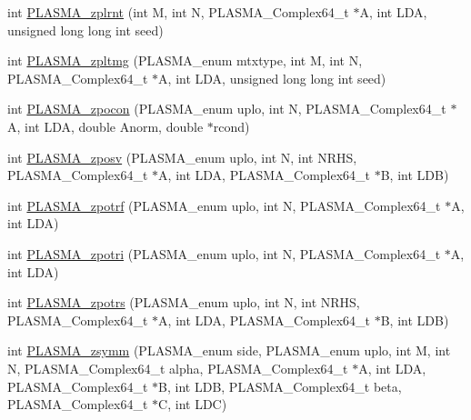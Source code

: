 \begin{DoxyCompactItemize}
\item 
int \hyperlink{group__PLASMA__Complex64__t_gaed78cffc7c2835c485ef7c8e3761d127_gaed78cffc7c2835c485ef7c8e3761d127}{P\+L\+A\+S\+M\+A\+\_\+zplrnt} (int M, int N, P\+L\+A\+S\+M\+A\+\_\+\+Complex64\+\_\+t $\ast$A, int L\+D\+A, unsigned long long int seed)
\item 
int \hyperlink{group__PLASMA__Complex64__t_ga0c1fc92152972274a3f2c7d482ccd365_ga0c1fc92152972274a3f2c7d482ccd365}{P\+L\+A\+S\+M\+A\+\_\+zpltmg} (P\+L\+A\+S\+M\+A\+\_\+enum mtxtype, int M, int N, P\+L\+A\+S\+M\+A\+\_\+\+Complex64\+\_\+t $\ast$A, int L\+D\+A, unsigned long long int seed)
\item 
int \hyperlink{group__PLASMA__Complex64__t_ga52f6ee7a56e26b17f1d9fbb421156688_ga52f6ee7a56e26b17f1d9fbb421156688}{P\+L\+A\+S\+M\+A\+\_\+zpocon} (P\+L\+A\+S\+M\+A\+\_\+enum uplo, int N, P\+L\+A\+S\+M\+A\+\_\+\+Complex64\+\_\+t $\ast$A, int L\+D\+A, double Anorm, double $\ast$rcond)
\item 
int \hyperlink{group__PLASMA__Complex64__t_gaed71622155778ea4372e34879184e742_gaed71622155778ea4372e34879184e742}{P\+L\+A\+S\+M\+A\+\_\+zposv} (P\+L\+A\+S\+M\+A\+\_\+enum uplo, int N, int N\+R\+H\+S, P\+L\+A\+S\+M\+A\+\_\+\+Complex64\+\_\+t $\ast$A, int L\+D\+A, P\+L\+A\+S\+M\+A\+\_\+\+Complex64\+\_\+t $\ast$B, int L\+D\+B)
\item 
int \hyperlink{group__PLASMA__Complex64__t_ga850a6c9da7c5632d160b28f211cdf2eb_ga850a6c9da7c5632d160b28f211cdf2eb}{P\+L\+A\+S\+M\+A\+\_\+zpotrf} (P\+L\+A\+S\+M\+A\+\_\+enum uplo, int N, P\+L\+A\+S\+M\+A\+\_\+\+Complex64\+\_\+t $\ast$A, int L\+D\+A)
\item 
int \hyperlink{group__PLASMA__Complex64__t_ga6dd563144dd8c7f29a58659f220f44a0_ga6dd563144dd8c7f29a58659f220f44a0}{P\+L\+A\+S\+M\+A\+\_\+zpotri} (P\+L\+A\+S\+M\+A\+\_\+enum uplo, int N, P\+L\+A\+S\+M\+A\+\_\+\+Complex64\+\_\+t $\ast$A, int L\+D\+A)
\item 
int \hyperlink{group__PLASMA__Complex64__t_gafa3392d835a508f57674c601c46eb331_gafa3392d835a508f57674c601c46eb331}{P\+L\+A\+S\+M\+A\+\_\+zpotrs} (P\+L\+A\+S\+M\+A\+\_\+enum uplo, int N, int N\+R\+H\+S, P\+L\+A\+S\+M\+A\+\_\+\+Complex64\+\_\+t $\ast$A, int L\+D\+A, P\+L\+A\+S\+M\+A\+\_\+\+Complex64\+\_\+t $\ast$B, int L\+D\+B)
\item 
int \hyperlink{group__PLASMA__Complex64__t_ga78d0974b51b7d019e0606422b3292b46_ga78d0974b51b7d019e0606422b3292b46}{P\+L\+A\+S\+M\+A\+\_\+zsymm} (P\+L\+A\+S\+M\+A\+\_\+enum side, P\+L\+A\+S\+M\+A\+\_\+enum uplo, int M, int N, P\+L\+A\+S\+M\+A\+\_\+\+Complex64\+\_\+t alpha, P\+L\+A\+S\+M\+A\+\_\+\+Complex64\+\_\+t $\ast$A, int L\+D\+A, P\+L\+A\+S\+M\+A\+\_\+\+Complex64\+\_\+t $\ast$B, int L\+D\+B, P\+L\+A\+S\+M\+A\+\_\+\+Complex64\+\_\+t beta, P\+L\+A\+S\+M\+A\+\_\+\+Complex64\+\_\+t $\ast$C, int L\+D\+C)

\end{DoxyCompactItemize}
